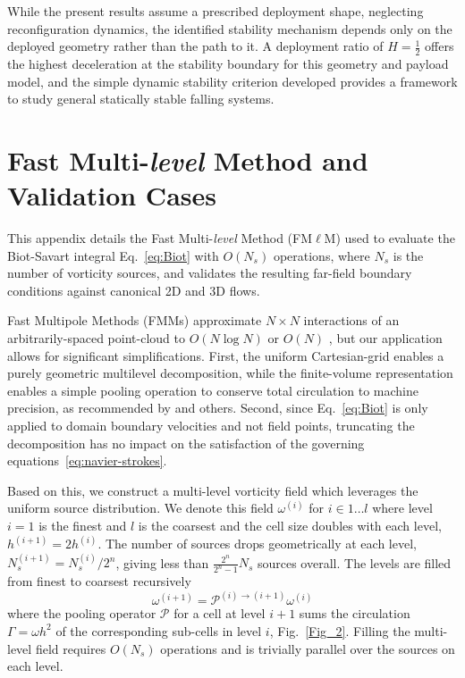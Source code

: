 \documentclass[lineno]{JFM-FLM_Au}
\begin{document}
While the present results assume a prescribed deployment shape, neglecting reconfiguration dynamics, the identified stability mechanism depends only on the deployed geometry rather than the path to it. A deployment ratio of $H=\tfrac{1}{2}$ offers the highest deceleration at the stability boundary for this geometry and payload model, and the simple dynamic stability criterion developed provides a framework to study general statically stable falling systems.




\appendix
\section{Fast Multi-\textit{level} Method and Validation Cases}\label{app:validation}

This appendix details the Fast Multi-\textit{level} Method (FM$\ell$M) used to evaluate the Biot-Savart integral Eq.~\ref{eq:Biot} with $O(N_s)$ operations, where $N_s$ is the number of vorticity sources, and validates the resulting far-field boundary conditions against canonical 2D and 3D flows.

Fast Multipole Methods (FMMs) approximate $N \times N$ interactions of an arbitrarily-spaced point-cloud to $O(N\log N)$ or $O(N)$ \citep{Greencard1987ASimulations, Fong2009TheMethod}, but our application allows for significant simplifications. First, the uniform Cartesian-grid enables a purely geometric multilevel decomposition, while the finite-volume representation enables a simple pooling operation to conserve total circulation to machine precision, as recommended by \cite{Colonius2008} and others. Second, since Eq.~\ref{eq:Biot} is only applied to domain boundary velocities and not field points, truncating the decomposition has no impact on the satisfaction of the governing equations~\ref{eq:navier-strokes}. 

Based on this, we construct a multi-level vorticity field which leverages the uniform source distribution. We denote this field $\omega^{(i)}$ for $i\in 1\ldots l$ where level $i=1$ is the finest and $l$ is the coarsest and the cell size doubles with each level, $h^{(i+1)}=2h^{(i)}$. The number of sources drops geometrically at each level, $N_s^{(i+1)}=N_s^{(i)}/2^n$, giving less than $\frac{2^n}{2^n-1} N_s$ sources overall. The levels are filled from finest to coarsest recursively 
\begin{equation}
    \omega^{(i+1)}=\mathcal{P}^{(i)\to(i+1)}\omega^{(i)}
\end{equation}
where the pooling operator $\mathcal{P}$ for a cell at level $i+1$ sums the circulation $\Gamma=\omega h^2$ of the corresponding sub-cells in level $i$, Fig.~\ref{Fig_2}. Filling the multi-level field requires $O(N_s)$ operations and is trivially parallel over the sources on each level.
\end{document}
